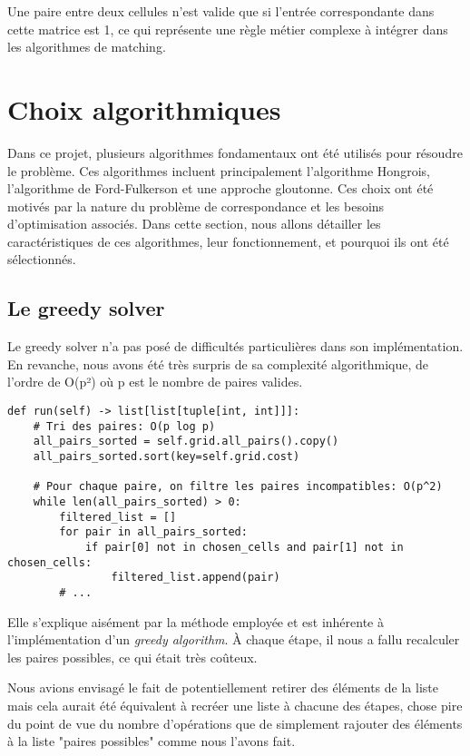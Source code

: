 \documentclass[11pt, a4paper]{article}
\begin{document}
Une paire entre deux cellules n'est valide que si l'entrée correspondante dans cette matrice est 1, ce qui représente une règle métier complexe à intégrer dans les algorithmes de matching.

\section{Choix algorithmiques}
\label{sec:algorithmes}

Dans ce projet, plusieurs algorithmes fondamentaux ont été utilisés pour résoudre le problème. Ces algorithmes incluent principalement l'algorithme Hongrois, l'algorithme de Ford-Fulkerson et une approche gloutonne. Ces choix ont été motivés par la nature du problème de correspondance et les besoins d'optimisation associés. Dans cette section, nous allons détailler les caractéristiques de ces algorithmes, leur fonctionnement, et pourquoi ils ont été sélectionnés.

\subsection{Le greedy solver}

Le greedy solver n'a pas posé de difficultés particulières dans son implémentation. En revanche, nous avons été très surpris de sa complexité algorithmique, de l'ordre de O(p²) où p est le nombre de paires valides.

\begin{lstlisting}[caption=Implementation du solveur glouton]
def run(self) -> list[list[tuple[int, int]]]:
    # Tri des paires: O(p log p)
    all_pairs_sorted = self.grid.all_pairs().copy()
    all_pairs_sorted.sort(key=self.grid.cost)
    
    # Pour chaque paire, on filtre les paires incompatibles: O(p^2)
    while len(all_pairs_sorted) > 0:
        filtered_list = []
        for pair in all_pairs_sorted:
            if pair[0] not in chosen_cells and pair[1] not in chosen_cells:
                filtered_list.append(pair)
        # ...
\end{lstlisting}

Elle s'explique aisément par la méthode employée et est inhérente à l'implémentation d'un \textit{greedy algorithm}. À chaque étape, il nous a fallu recalculer les paires possibles, ce qui était très coûteux.

Nous avions envisagé le fait de potentiellement retirer des éléments de la liste mais cela aurait été équivalent à recréer une liste à chacune des étapes, chose pire du point de vue du nombre d'opérations que de simplement rajouter des éléments à la liste "paires possibles" comme nous l'avons fait.
\end{document}
